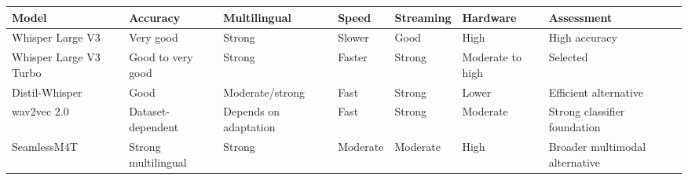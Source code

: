 \documentclass[
  letterpaper,
  12pt,
  a4paper,
  openany]{report}
\newcounter{none} %
\begin{document}
{\def\LTcaptype{none} %
\begin{longtable}[]{@{}
  >{\raggedright\arraybackslash}p{}
  >{\raggedright\arraybackslash}p{}
  >{\raggedright\arraybackslash}p{}
  >{\raggedright\arraybackslash}p{}
  >{\raggedright\arraybackslash}p{}
  >{\raggedright\arraybackslash}p{}
  >{\raggedright\arraybackslash}p{}@{}}
\toprule\noalign{}
\begin{minipage}[b]{\linewidth}\raggedright
Model
\end{minipage} & \begin{minipage}[b]{\linewidth}\raggedright
Accuracy
\end{minipage} & \begin{minipage}[b]{\linewidth}\raggedright
Multilingual
\end{minipage} & \begin{minipage}[b]{\linewidth}\raggedright
Speed
\end{minipage} & \begin{minipage}[b]{\linewidth}\raggedright
Streaming
\end{minipage} & \begin{minipage}[b]{\linewidth}\raggedright
Hardware
\end{minipage} & \begin{minipage}[b]{\linewidth}\raggedright
Assessment
\end{minipage} \\
\midrule\noalign{}
\endhead
\bottomrule\noalign{}
\endlastfoot
Whisper Large V3 & Very good & Strong & Slower & Good & High & High
accuracy \\
Whisper Large V3 Turbo & Good to very good & Strong & Faster & Strong &
Moderate to high & Selected \\
Distil-Whisper & Good & Moderate/strong & Fast & Strong & Lower &
Efficient alternative \\
wav2vec 2.0 & Dataset-dependent & Depends on adaptation & Fast & Strong
& Moderate & Strong classifier foundation \\
SeamlessM4T & Strong multilingual & Strong & Moderate & Moderate & High
& Broader multimodal alternative \\
\end{longtable}
}
\end{document}

